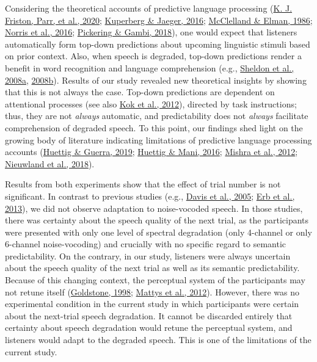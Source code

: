 \documentclass[a4paper, nobind]{templates/ociamthesis}
\begin{document}
Considering the theoretical accounts of predictive language processing (\protect\hyperlink{ref-Friston2020}{K. J. Friston, Parr, et al., 2020}; \protect\hyperlink{ref-Kuperberg2016}{Kuperberg \& Jaeger, 2016}; \protect\hyperlink{ref-Mcclelland1986}{McClelland \& Elman, 1986}; \protect\hyperlink{ref-Norris2016}{Norris et al., 2016}; \protect\hyperlink{ref-Pickering2018}{Pickering \& Gambi, 2018}), one would expect that listeners automatically form top-down predictions about upcoming linguistic stimuli based on prior context.
Also, when speech is degraded, top-down predictions render a benefit in word recognition and language comprehension (e.g., \protect\hyperlink{ref-Sheldon2008a}{Sheldon et al., 2008a}, \protect\hyperlink{ref-Sheldon2008b}{2008b}).
Results of our study revealed new theoretical insights by showing that this is not always the case.
Top-down predictions are dependent on attentional processes (see also \protect\hyperlink{ref-Kok2012}{Kok et al., 2012}), directed by task instructions;
thus, they are not \emph{always} automatic, and predictability does not \emph{always} facilitate comprehension of degraded speech.
To this point, our findings shed light on the growing body of literature indicating limitations of predictive language processing accounts (\protect\hyperlink{ref-Huettig2019}{Huettig \& Guerra, 2019}; \protect\hyperlink{ref-Huettig2016}{Huettig \& Mani, 2016}; \protect\hyperlink{ref-Mishra2012}{Mishra et al., 2012}; \protect\hyperlink{ref-Nieuwland2018}{Nieuwland et al., 2018}).

Results from both experiments show that the effect of trial number is not significant.
In contrast to previous studies (e.g., \protect\hyperlink{ref-Davis2005}{Davis et al., 2005}; \protect\hyperlink{ref-Erb2013}{Erb et al., 2013}), we did not observe adaptation to noise-vocoded speech.
In those studies, there was certainty about the speech quality of the next trial, as the participants were presented with only one level of spectral degradation (only 4-channel or only 6-channel noise-vocoding)
and crucially with no specific regard to semantic predictability.
On the contrary, in our study, listeners were always uncertain about the speech quality of the next trial as well as its semantic predictability.
Because of this changing context, the perceptual system of the participants may not retune itself (\protect\hyperlink{ref-Goldstone1998}{Goldstone, 1998}; \protect\hyperlink{ref-Mattys2012}{Mattys et al., 2012}).
However, there was no experimental condition in the current study in which participants were certain about the next-trial speech degradation.
It cannot be discarded entirely that certainty about speech degradation would retune the perceptual system,
and listeners would adapt to the degraded speech.
This is one of the limitations of the current study.
\end{document}
